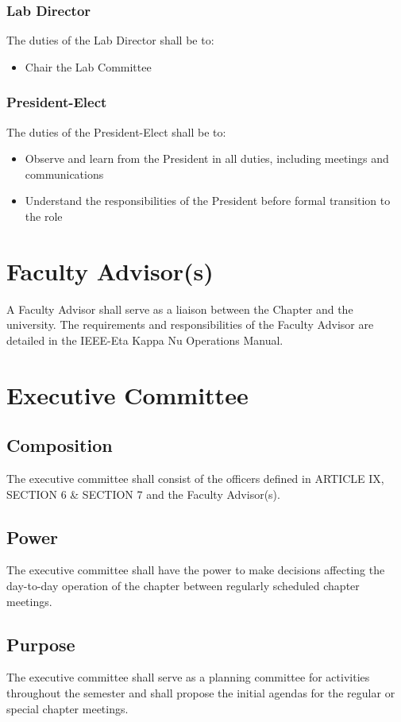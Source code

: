 \documentclass[10pt, oneside]{article}
\begin{document}
\subsubsection{Lab Director}
The duties of the Lab Director shall be to:
\begin{itemize}
\item Chair the Lab Committee
\end{itemize}
\subsubsection{President-Elect}
The duties of the President-Elect shall be to:
\begin{itemize}
\item Observe and learn from the President in all duties, including meetings and communications
\item Understand the responsibilities of the President before formal transition to the role
\end{itemize}

\section{Faculty Advisor(s)}
A Faculty Advisor shall serve as a liaison between the Chapter and the university. The requirements and responsibilities of the Faculty Advisor are detailed in the IEEE-Eta Kappa Nu Operations Manual.

\section{Executive Committee}
\subsection{Composition}
The executive committee shall consist of the officers defined in ARTICLE IX, SECTION 6 \& SECTION 7 and the Faculty Advisor(s).
\subsection{Power}
The executive committee shall have the power to make decisions affecting the day-to-day operation of the chapter between regularly scheduled chapter meetings.
\subsection{Purpose}
The executive committee shall serve as a planning committee for activities throughout the semester and shall propose the initial agendas for the regular or special chapter meetings.
\end{document}

